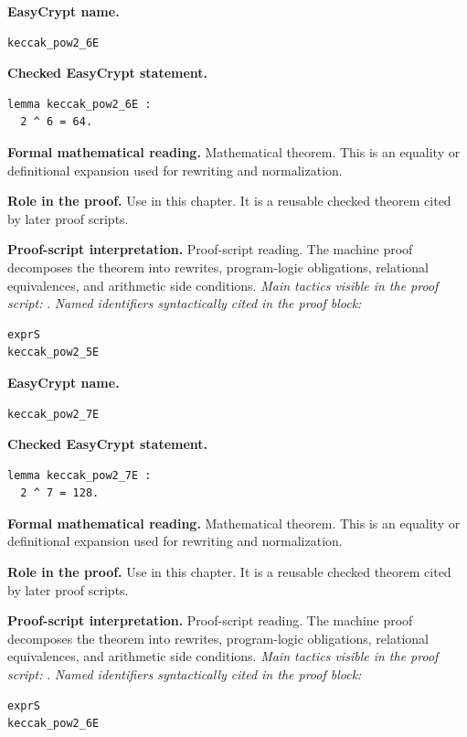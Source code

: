 \begin{formaltheorem}
\noindent\textbf{EasyCrypt name.}
\begin{lstlisting}[language=EasyCrypt,basicstyle=\ttfamily\scriptsize]
keccak_pow2_6E
\end{lstlisting}
\noindent\textbf{Checked EasyCrypt statement.}
\begin{lstlisting}[language=EasyCrypt,basicstyle=\ttfamily\scriptsize]
lemma keccak_pow2_6E :
  2 ^ 6 = 64.
\end{lstlisting}
\noindent\textbf{Formal mathematical reading.}
Mathematical theorem. This is an equality or definitional expansion used for rewriting and normalization.

\noindent\textbf{Role in the proof.}
Use in this chapter. It is a reusable checked theorem cited by later proof scripts.

\noindent\textbf{Proof-script interpretation.}
Proof-script reading. The machine proof decomposes the theorem into rewrites, program-logic obligations, relational equivalences, and arithmetic side conditions.
\emph{Main tactics visible in the proof script:} .
\emph{Named identifiers syntactically cited in the proof block:}
\begin{lstlisting}[language=EasyCrypt,basicstyle=\ttfamily\scriptsize]
exprS
keccak_pow2_5E
\end{lstlisting}

\end{formaltheorem}

\begin{formaltheorem}
\noindent\textbf{EasyCrypt name.}
\begin{lstlisting}[language=EasyCrypt,basicstyle=\ttfamily\scriptsize]
keccak_pow2_7E
\end{lstlisting}
\noindent\textbf{Checked EasyCrypt statement.}
\begin{lstlisting}[language=EasyCrypt,basicstyle=\ttfamily\scriptsize]
lemma keccak_pow2_7E :
  2 ^ 7 = 128.
\end{lstlisting}
\noindent\textbf{Formal mathematical reading.}
Mathematical theorem. This is an equality or definitional expansion used for rewriting and normalization.

\noindent\textbf{Role in the proof.}
Use in this chapter. It is a reusable checked theorem cited by later proof scripts.

\noindent\textbf{Proof-script interpretation.}
Proof-script reading. The machine proof decomposes the theorem into rewrites, program-logic obligations, relational equivalences, and arithmetic side conditions.
\emph{Main tactics visible in the proof script:} .
\emph{Named identifiers syntactically cited in the proof block:}
\begin{lstlisting}[language=EasyCrypt,basicstyle=\ttfamily\scriptsize]
exprS
keccak_pow2_6E
\end{lstlisting}

\end{formaltheorem}

